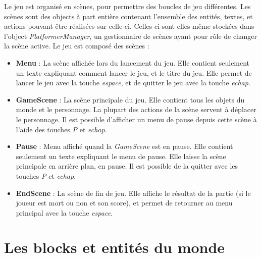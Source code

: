 \documentclass[10pt]{report}
\begin{document}
Le jeu est organisé en scènes, pour permettre des boucles de jeu différentes.
Les scènes sont des objects à part entière contenant l'ensemble des entités, textes, et actions pouvant être réalisées sur celle-ci.
Celles-ci sont elles-même stockées dans l'object \emph{PlatformerManager}, un gestionnaire de scènes ayant pour rôle de changer la scène active.
Le jeu est composé des scènes :\\
\begin{itemize}
  \item \textbf{Menu} : La scène affichée lors du lancement du jeu.
  Elle contient seulement un texte expliquant comment lancer le jeu, et le titre du jeu.
  Elle permet de lancer le jeu avec la touche \emph{espace}, et de quitter le jeu avec la touche \emph{echap}.
  \item \textbf{GameScene} : La scène principale du jeu.
  Elle contient tous les objets du monde et le personnage.
  La plupart des actions de la scène servent à déplacer le personnage.
  Il est possible d'afficher un menu de pause depuis cette scène à l'aide des touches \emph{P} et \emph{echap}.
  \item \textbf{Pause} : Menu affiché quand la \emph{GameScene} est en pause.
  Elle contient seulement un texte expliquant le menu de pause.
  Elle laisse la scène principale en arrière plan, en pause.
  Il est possible de la quitter avec les touches \emph{P} et \emph{echap}.
  \item \textbf{EndScene} : La scène de fin de jeu.
  Elle affiche le résultat de la partie (si le joueur est mort ou non et son score), et permet de retourner au menu principal avec la touche \emph{espace}.
\end{itemize}

\section{Les blocks et entités du monde}
\end{document}

